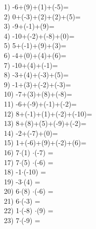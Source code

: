 \documentclass[a4paper,10pt]{article}
\begin{document}
1)   -6+(9)+(1)+(-5)=
\vspace{0.5cm}\\2)   0+(-3)+(2)+(2)+(5)=
\vspace{0.5cm}\\3)   -9+(-1)+(9)=
\vspace{0.5cm}\\4)   -10+(-2)+(-8)+(0)=
\vspace{0.5cm}\\5)   5+(-1)+(9)+(3)=
\vspace{0.5cm}\\6)   -4+(0)+(4)+(6)=
\vspace{0.5cm}\\7)   -10+(4)+(-1)=
\vspace{0.5cm}\\8)   -3+(4)+(-3)+(5)=
\vspace{0.5cm}\\9)   -1+(3)+(-2)+(-3)=
\vspace{0.5cm}\\10)   -7+(3)+(8)+(-8)=
\vspace{0.5cm}\\11)   -6+(-9)+(-1)+(-2)=
\vspace{0.5cm}\\12)   8+(-1)+(1)+(-2)+(-10)=
\vspace{0.5cm}\\13)   8+(8)+(5)+(-9)+(-2)=
\vspace{0.5cm}\\14)   -2+(-7)+(0)=
\vspace{0.5cm}\\15)   1+(-6)+(9)+(-2)+(6)=
\vspace{0.5cm}\\16)   7$\cdot$(1) $\cdot$(-7) =
\vspace{0.5cm}\\17)   7$\cdot$(5) $\cdot$(-6) =
\vspace{0.5cm}\\18)   -1$\cdot$(-10) =
\vspace{0.5cm}\\19)   -3$\cdot$(4) =
\vspace{0.5cm}\\20)   6$\cdot$(8) $\cdot$(-6) =
\vspace{0.5cm}\\21)   6$\cdot$(-3) =
\vspace{0.5cm}\\22)   1$\cdot$(-8) $\cdot$(9) =
\vspace{0.5cm}\\23)   7$\cdot$(-9) =
\end{document}
